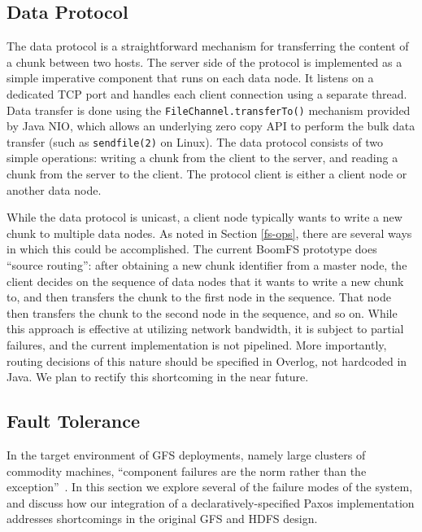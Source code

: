 \documentclass{article}
\begin{document}
\subsection{Data Protocol}
The data protocol is a straightforward mechanism for transferring the
content of a chunk between two hosts. The server side of the protocol
is implemented as a simple imperative component that runs on each data
node. It listens on a dedicated TCP port and handles each client
connection using a separate thread. Data transfer is done using the
\texttt{FileChannel.transferTo()} mechanism provided by Java NIO,
which allows an underlying zero copy API to perform the bulk data
transfer (such as \texttt{sendfile(2)} on Linux). The data protocol
consists of two simple operations: writing a chunk from the client to
the server, and reading a chunk from the server to the client. The
protocol client is either a client node or another data node.

While the data protocol is unicast, a client node typically wants to
write a new chunk to multiple data nodes. As noted in Section
\ref{fs-ops}, there are several ways in which this could be
accomplished. The current BoomFS prototype does ``source routing'':
after obtaining a new chunk identifier from a master node, the client
decides on the sequence of data nodes that it wants to write a new
chunk to, and then transfers the chunk to the first node in the
sequence. That node then transfers the chunk to the second node in the
sequence, and so on. While this approach is effective at utilizing
network bandwidth, it is subject to partial failures, and the current
implementation is not pipelined. More importantly, routing decisions
of this nature should be specified in Overlog, not hardcoded in
Java. We plan to rectify this shortcoming in the near future.

\subsection{Fault Tolerance}
In the target environment of GFS deployments, namely large clusters of
commodity machines, ``component failures are the norm rather than the
exception''~\cite{gfs}.  In this section we explore several of the
failure modes of the system, and discuss how our integration of a
declaratively-specified Paxos implementation addresses shortcomings in
the original GFS and HDFS design.
\end{document}
